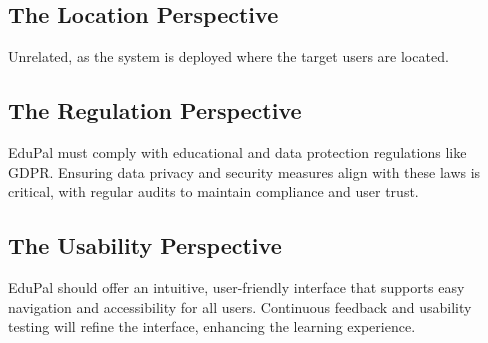 \subsection{The Location Perspective}

Unrelated, as the system is deployed where the target users are located.


\subsection{The Regulation Perspective}

EduPal must comply with educational and data protection regulations like GDPR. Ensuring data privacy and security measures align with these laws is critical, with regular audits to maintain compliance and user trust.


\subsection{The Usability Perspective}

EduPal should offer an intuitive, user-friendly interface that supports easy navigation and accessibility for all users. Continuous feedback and usability testing will refine the interface, enhancing the learning experience.
